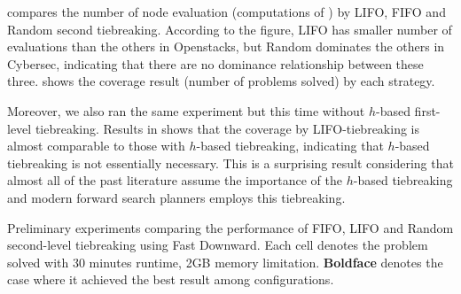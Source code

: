  compares the number of
node evaluation (computations of \lmcut) by LIFO, FIFO and Random second
tiebreaking.  According to the figure, LIFO has smaller number of
evaluations than the others in Openstacks, but Random dominates the
others in Cybersec, indicating that there are no dominance relationship
between these three.   shows the coverage result
(number of problems solved) by each strategy.

Moreover, we also ran the same experiment but this time without $h$-based
first-level tiebreaking. Results in  shows that the
coverage by LIFO-tiebreaking is almost comparable to those with $h$-based
tiebreaking, indicating that $h$-based tiebreaking is not essentially necessary.
This is a surprising result considering that almost all of the past literature assume the importance of the $h$-based tiebreaking and modern forward search planners employs this tiebreaking.


% 
\begin{table}[htbp]
 \centering {}
 
 \caption{Preliminary experiments comparing the performance of FIFO,
 LIFO and Random second-level tiebreaking using Fast Downward. Each cell
 denotes the problem solved with 30 minutes runtime, 2GB memory
 limitation. \textbf{Boldface} denotes the case where it achieved the
 best result among configurations.} \label{single-coverage}
\end{table}

